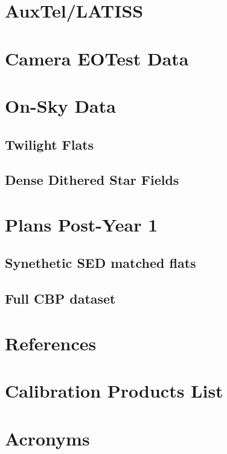 \documentclass[SE,authoryear,toc]{article}
\begin{document}
\begin{table}[|||]
\section{AuxTel/LATISS}

\section{Camera EOTest Data}

\section{On-Sky Data}
\subsection{Twilight Flats}
\subsection{Dense Dithered Star Fields}

\section{Plans Post-Year 1}
\subsection{Synethetic SED matched flats}
\subsection{Full CBP dataset}
\section{References} \label{sec:bib}
\renewcommand{\refname}{} %


\appendix
\section{Calibration Products List}


\section{Acronyms} \label{sec:acronyms}



\end{table}
\end{document}
